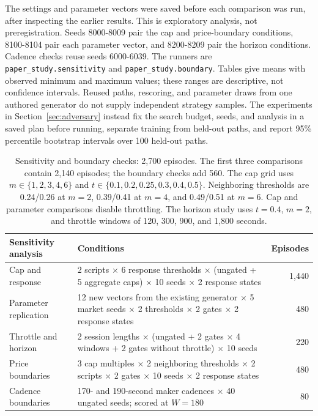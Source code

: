 \documentclass{article}
\begin{document}
The settings and parameter vectors were saved before each comparison was run, after inspecting the earlier results. This is exploratory analysis, not preregistration. Seeds 8000-8009 pair the cap and price-boundary conditions, 8100-8104 pair each parameter vector, and 8200-8209 pair the horizon conditions. Cadence checks reuse seeds 6000-6039. The runners are \texttt{paper\_study.sensitivity} and \texttt{paper\_study.boundary}. Tables give means with observed minimum and maximum values; these ranges are descriptive, not confidence intervals. Reused paths, rescoring, and parameter draws from one authored generator do not supply independent strategy samples. The experiments in Section~\ref{sec:adversary} instead fix the search budget, seeds, and analysis in a saved plan before running, separate training from held-out paths, and report 95\% percentile bootstrap intervals over 100 held-out paths.

\begin{table}[htbp]
\centering
\small
\begin{tabularx}{\linewidth}{lXr}
\toprule
\textbf{Sensitivity analysis} & \textbf{Conditions} & \textbf{Episodes} \\
\midrule
Cap and response & 2 scripts $\times$ 6 response thresholds $\times$ (ungated + 5 aggregate caps) $\times$ 10 seeds $\times$ 2 response states & 1,440 \\
Parameter replication & 12 new vectors from the existing generator $\times$ 5 market seeds $\times$ 2 thresholds $\times$ 2 gates $\times$ 2 response states & 480 \\
Throttle and horizon & 2 session lengths $\times$ (ungated + 2 gates $\times$ 4 windows + 2 gates without throttle) $\times$ 10 seeds & 220 \\
Price boundaries & 3 cap multiples $\times$ 2 neighboring thresholds $\times$ 2 scripts $\times$ 2 gates $\times$ 10 seeds $\times$ 2 response states & 480 \\
Cadence boundaries & 170- and 190-second maker cadences $\times$ 40 ungated seeds; scored at $W = 180$ & 80 \\
\bottomrule
\end{tabularx}
\caption{Sensitivity and boundary checks: 2,700 episodes. The first three comparisons contain 2,140 episodes; the boundary checks add 560. The cap grid uses $m \in \{1, 2, 3, 4, 6\}$ and $t \in \{0.1, 0.2, 0.25, 0.3, 0.4, 0.5\}$. Neighboring thresholds are 0.24/0.26 at $m = 2$, 0.39/0.41 at $m = 4$, and 0.49/0.51 at $m = 6$. Cap and parameter comparisons disable throttling. The horizon study uses $t = 0.4$, $m = 2$, and throttle windows of 120, 300, 900, and 1,800 seconds.}
\label{tab:sensitivity}
\end{table}
\end{document}
